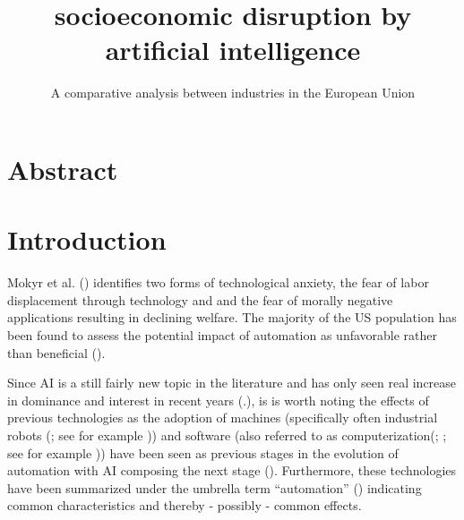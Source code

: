 \documentclass[
  11,
  a4paperpaper,
]{article}
\title{socioeconomic disruption by artificial intelligence}
\subtitle{A comparative analysis between industries in the European
Union}
\author{}
\date{}
\let\oldsection\section
\renewcommand\section{\clearpage\oldsection}
\begin{document}
\maketitle
{}

\newpage{}

\tableofcontents

\newpage{}

\listoffigures

\newpage{}

\listoftables

\newpage{}


\section{Abstract}\label{abstract}

\section{Introduction}\label{sec-introduction}

Mokyr et al. () identifies
two forms of technological anxiety, the fear of labor displacement
through technology and and the fear of morally negative applications
resulting in declining welfare. The majority of the US population has
been found to assess the potential impact of automation as unfavorable
rather than beneficial
().

Since AI is a still fairly new topic in the literature and has only seen
real increase in dominance and interest in recent years
(.), is
is worth noting the effects of previous technologies as the adoption of
machines (specifically often industrial robots
(; see
for example
)) and
software (also referred to as
computerization(;
; see for example
))
have been seen as previous stages in the evolution of automation with AI
composing the next stage (). Furthermore, these technologies have been summarized
under the umbrella term ``automation''
()
indicating common characteristics and thereby - possibly - common
effects.
\end{document}
